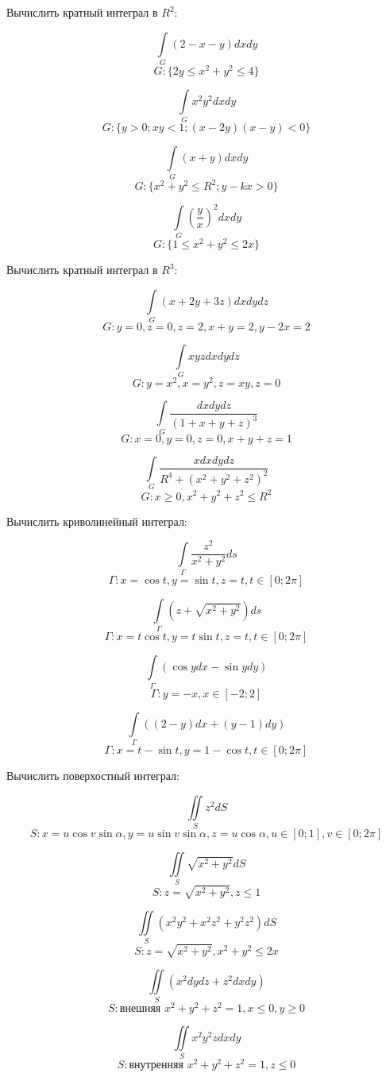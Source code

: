 \documentclass[russian]{article}
\begin{document}
 
Вычислить кратный интеграл в $R^2$:

$$\int\limits_{G} (2 - x - y) dxdy$$
$$G: \{2y \le x^2 + y^2 \le 4\}$$

$$\int\limits_{G} x^2 y^2 dxdy$$
$$G: \{y > 0; xy < 1; (x - 2y)(x - y) < 0\}$$

$$\int\limits_{G} (x + y) dxdy$$
$$G: \{x^2 + y^2 \le R^2; y - kx > 0\}$$

$$\int\limits_{G} \left(\frac{y}{x}\right)^2dxdy$$
$$G: \{1 \le x^2 + y^2 \le 2x\}$$

Вычислить кратный интеграл в $R^3$:

$$\int\limits_{G} (x + 2y + 3z) dx dy dz$$
$$G: y = 0, z= 0, z = 2, x + y = 2, y - 2x = 2$$

$$\int\limits_{G} xyz dx dy dz$$
$$G: y = x^2, x = y^2, z = xy, z = 0$$

$$\int\limits_{G} \frac{dx dy dz}{(1 + x + y + z)^3}$$
$$G: x = 0, y = 0, z = 0, x + y + z = 1$$

$$\int\limits_{G} \frac{x dx dy dz}{R^4 + (x^2 + y^2 + z^2)^2}$$
$$G: x \ge 0, x^2 + y^2 + z^2 \le R^2$$

Вычислить криволинейный интеграл:

$$\int\limits_{\Gamma} \frac{z^2}{x^2 + y^2} ds$$
$$\Gamma: x = \cos t, y = \sin t, z = t, t \in [0; 2\pi]$$

$$\int\limits_{\Gamma} (z + \sqrt{x^2 + y^2}) ds$$
$$\Gamma: x = t\cos t, y = t\sin t, z = t, t \in [0; 2\pi]$$

$$\int\limits_{\Gamma} (\cos y dx - \sin y dy)$$
$$\Gamma: y = -x, x \in [-2; 2]$$

$$\int\limits_{\Gamma} ((2 - y) dx + (y - 1) dy)$$
$$\Gamma: x = t - \sin t, y = 1 - \cos t, t \in [0; 2\pi]$$

Вычислить поверхостный интеграл:

$$\iint\limits_S z^2 dS$$
$$S: x = u \cos v \sin \alpha, y = u \sin v \sin \alpha, z = u \cos \alpha, u \in [0; 1], v \in [0; 2\pi]$$

$$\iint\limits_S \sqrt{x^2 + y^2} dS$$
$$S: z = \sqrt{x^2 + y^2}, z \le 1$$

$$\iint\limits_S (x^2y^2 + x^2 z^2 + y^2 z^2) dS$$
$$S: z = \sqrt{x^2 + y^2}, x^2 + y^2 \le 2x$$

$$\iint\limits_S (x^2 dy dz + z^2 dx dy)$$
$$S: \text{внешняя } x^2 +y^2 + z^2 = 1, x \le 0, y \ge 0$$

$$\iint\limits_S x^2 y^2 z dx dy$$
$$S: \text{внутренняя } x^2 + y^2 + z^2 = 1, z \le 0$$
 
 
\end{document}

